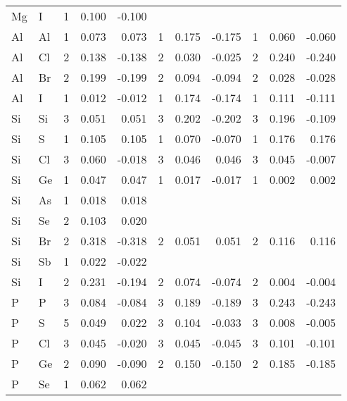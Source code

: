 \begin{table}
\begin{center}
\begin{tabular}{llrrrrrrrrr}
 Mg &   I &   1 &    0.100 &   -0.100 &     &          &          &     &          &          \\
 Al &  Al &   1 &    0.073 &    0.073 &   1 &    0.175 &   -0.175 &   1 &    0.060 &   -0.060 \\
 Al &  Cl &   2 &    0.138 &   -0.138 &   2 &    0.030 &   -0.025 &   2 &    0.240 &   -0.240 \\
 Al &  Br &   2 &    0.199 &   -0.199 &   2 &    0.094 &   -0.094 &   2 &    0.028 &   -0.028 \\
 Al &   I &   1 &    0.012 &   -0.012 &   1 &    0.174 &   -0.174 &   1 &    0.111 &   -0.111 \\
 Si &  Si &   3 &    0.051 &    0.051 &   3 &    0.202 &   -0.202 &   3 &    0.196 &   -0.109 \\
 Si &   S &   1 &    0.105 &    0.105 &   1 &    0.070 &   -0.070 &   1 &    0.176 &    0.176 \\
 Si &  Cl &   3 &    0.060 &   -0.018 &   3 &    0.046 &    0.046 &   3 &    0.045 &   -0.007 \\
 Si &  Ge &   1 &    0.047 &    0.047 &   1 &    0.017 &   -0.017 &   1 &    0.002 &    0.002 \\
 Si &  As &   1 &    0.018 &    0.018 &     &          &          &     &          &          \\
 Si &  Se &   2 &    0.103 &    0.020 &     &          &          &     &          &          \\
 Si &  Br &   2 &    0.318 &   -0.318 &   2 &    0.051 &    0.051 &   2 &    0.116 &    0.116 \\
 Si &  Sb &   1 &    0.022 &   -0.022 &     &          &          &     &          &          \\
 Si &   I &   2 &    0.231 &   -0.194 &   2 &    0.074 &   -0.074 &   2 &    0.004 &   -0.004 \\
  P &   P &   3 &    0.084 &   -0.084 &   3 &    0.189 &   -0.189 &   3 &    0.243 &   -0.243 \\
  P &   S &   5 &    0.049 &    0.022 &   3 &    0.104 &   -0.033 &   3 &    0.008 &   -0.005 \\
  P &  Cl &   3 &    0.045 &   -0.020 &   3 &    0.045 &   -0.045 &   3 &    0.101 &   -0.101 \\
  P &  Ge &   2 &    0.090 &   -0.090 &   2 &    0.150 &   -0.150 &   2 &    0.185 &   -0.185 \\
  P &  Se &   1 &    0.062 &    0.062 &     &          &          &     &          &          \\

\end{tabular}
\end{center}
\end{table}
